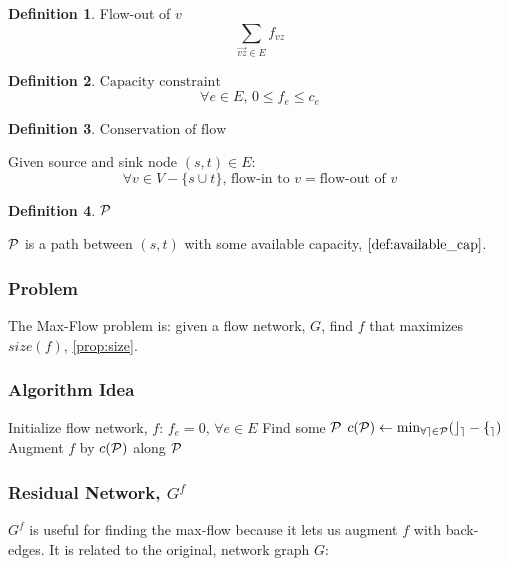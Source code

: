 \documentclass{article}
\theoremstyle{definition}
\newtheorem{definition}{Definition}[section]
\begin{document}
\begin{definition}{Flow-out of $v$}
\label{def:flowout}
$$\sum_{\overrightarrow{vz} \in E}{f_{vz}}$$
\end{definition}

\begin{definition}{$\text{Capacity constraint}$}
\label{prop:capacity}
$$\forall e \in E, \, 0 \leq f_e \leq c_e$$
\end{definition}

\begin{definition}{$\text{Conservation of flow}$}
\label{prop:conservation}

Given source and sink node $(s,t) \in E$:
$$\forall v \in V - \{s \cup t\}, \, \text{flow-in to } v = \text{flow-out of } v$$ 
\end{definition}

\begin{definition}{$\cal{P}$}
	\label{prop:cal_p}
	
	$\cal{P}$ is a path between $(s,t)$ with some available capacity, $\ref{def:available_cap}$.
\end{definition}

\subsubsection{Problem}
The Max-Flow problem is: given a flow network, $G$, find $f$ that maximizes $size(f)$, \ref{prop:size}.

\subsubsection{Algorithm Idea}
\begin{algorithm}
\caption{$NaiveMaxFlow$}
\label{alg:naive_max_flow}
\begin{algorithmic}[1]
	\STATE Initialize flow network, $f$: $f_e = 0, \, \forall e \in E$
	\STATE Find some $\cal{P}$ 
		\STATE $c(\cal{P}) \gets \min_{\forall e \in \cal{P}} (c_e-f_e)$ 
		\STATE Augment $f$ by $c(\cal{P})$ along $\cal{P}$
	\ENDWHILE
\end{algorithmic}
\end{algorithm}

\subsubsection{Residual Network, $G^f$}
\label{residual_net}
$G^f$ is useful for finding the max-flow because it lets us augment $f$ with back-edges. It is related to the original, network graph $G$:
\end{document}
